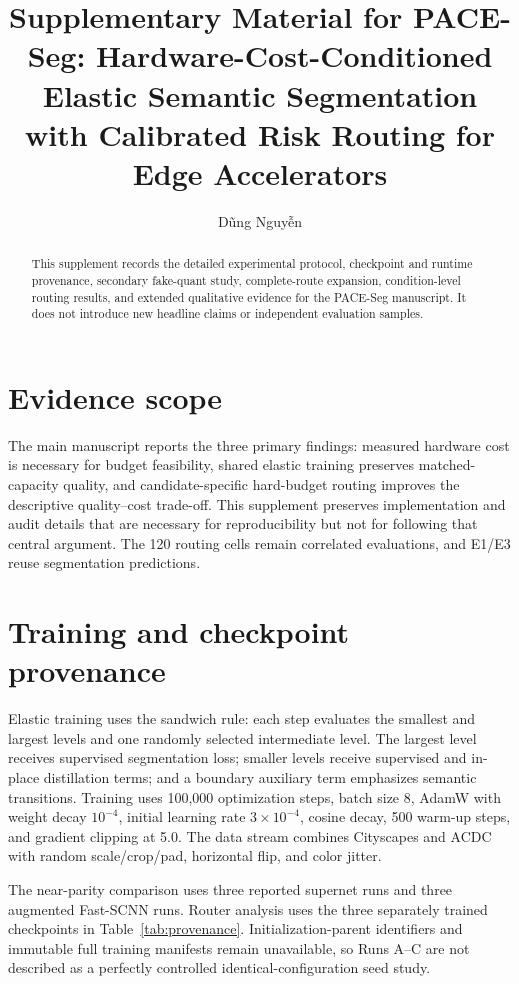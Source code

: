 \documentclass[a4paper,review,12pt]{elsarticle}
\begin{document}
\begin{frontmatter}
\title{Supplementary Material for PACE-Seg: Hardware-Cost-Conditioned Elastic Semantic Segmentation with Calibrated Risk Routing for Edge Accelerators}
\author{D\~{u}ng Nguy\~{\^{e}}n}
\begin{abstract}
This supplement records the detailed experimental protocol, checkpoint and runtime provenance, secondary fake-quant study, complete-route expansion, condition-level routing results, and extended qualitative evidence for the PACE-Seg manuscript. It does not introduce new headline claims or independent evaluation samples.
\end{abstract}
\end{frontmatter}

\section{Evidence scope}

The main manuscript reports the three primary findings: measured hardware cost is necessary for budget feasibility, shared elastic training preserves matched-capacity quality, and candidate-specific hard-budget routing improves the descriptive quality--cost trade-off. This supplement preserves implementation and audit details that are necessary for reproducibility but not for following that central argument. The 120 routing cells remain correlated evaluations, and E1/E3 reuse segmentation predictions.

\section{Training and checkpoint provenance}

Elastic training uses the sandwich rule: each step evaluates the smallest and largest levels and one randomly selected intermediate level. The largest level receives supervised segmentation loss; smaller levels receive supervised and in-place distillation terms; and a boundary auxiliary term emphasizes semantic transitions. Training uses 100,000 optimization steps, batch size 8, AdamW with weight decay $10^{-4}$, initial learning rate $3\times10^{-4}$, cosine decay, 500 warm-up steps, and gradient clipping at 5.0. The data stream combines Cityscapes and ACDC with random scale/crop/pad, horizontal flip, and color jitter.

The near-parity comparison uses three reported supernet runs and three augmented Fast-SCNN runs. Router analysis uses the three separately trained checkpoints in Table~\ref{tab:provenance}. Initialization-parent identifiers and immutable full training manifests remain unavailable, so Runs A--C are not described as a perfectly controlled identical-configuration seed study.
\end{document}
